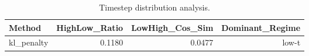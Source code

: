 \begin{table}[htbp]
\centering
\caption{Timestep distribution analysis.}
\label{tab:t_dist}
\begin{tabular}{lrrr}
\toprule
\textbf{Method} & \textbf{HighLow\_Ratio} & \textbf{LowHigh\_Cos\_Sim} & \textbf{Dominant\_Regime} \\
\midrule
kl\_penalty & 0.1180 & 0.0477 & low-t \\
\bottomrule
\end{tabular}
\end{table}